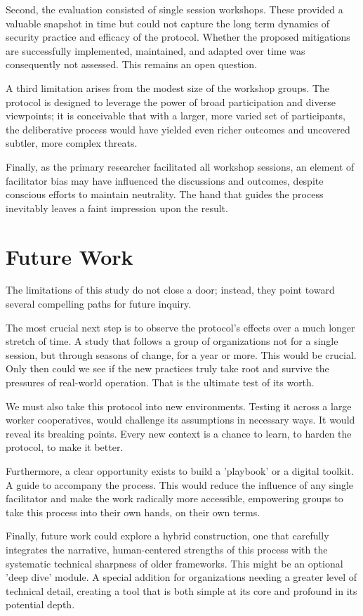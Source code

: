 Second, the evaluation consisted of single session workshops. These provided a
valuable snapshot in time but could not capture the long term dynamics of
security practice and efficacy of the protocol. Whether the
proposed mitigations are successfully implemented, maintained, and adapted over
time was consequently not assessed. This remains an open question.

A third limitation arises from the modest size of the workshop groups. The
protocol is designed to leverage the power of broad participation and diverse
viewpoints; it is conceivable that with a larger, more varied set of
participants, the deliberative process would have yielded even richer outcomes
and uncovered subtler, more complex threats.

Finally, as the primary researcher facilitated all workshop sessions, an element
of facilitator bias may have influenced the discussions and outcomes, despite
conscious efforts to maintain neutrality. The hand that guides the process
inevitably leaves a faint impression upon the result.

\section{Future Work}
\label{sec:future-work}

The limitations of this study do not close a door; instead, they point toward
several compelling paths for future inquiry.

The most crucial next step is to observe the protocol's effects over a much
longer stretch of time. A study that follows a group of organizations not for a
single session, but through seasons of change, for a year or more. This would be
crucial. Only then could we see if the new practices truly take root and
survive the pressures of real-world operation. That is the ultimate test of its
worth.

We must also take this protocol into new environments. Testing it across a large worker
cooperatives, would challenge its assumptions in necessary ways. It would reveal
its breaking points. Every new context is a chance to learn, to harden the
protocol, to make it better.

Furthermore, a clear opportunity exists to build a 'playbook' or a digital
toolkit. A guide to accompany the process. This would reduce
the influence of any single facilitator and make the work radically more
accessible, empowering groups to take this process into their own
hands, on their own terms.

Finally, future work could explore a hybrid construction, one that carefully integrates
the narrative, human-centered strengths of this process with the systematic technical
sharpness of older frameworks. This might be an optional 'deep dive' module. A special
addition for organizations needing a greater level of technical detail, creating
a tool that is both simple at its core and profound in its potential depth.